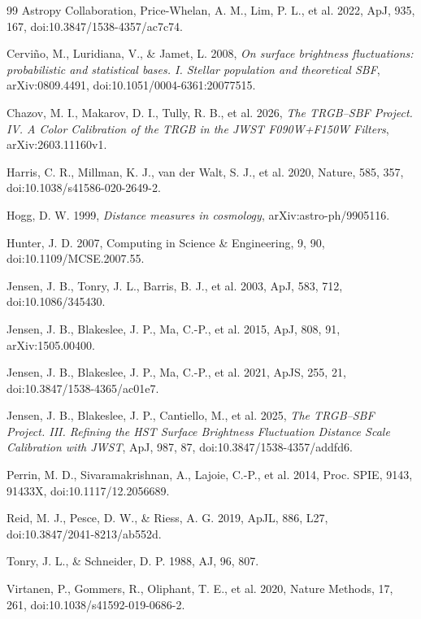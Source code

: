 \documentclass[nodoi,nocopyright]{pas}
\begin{document}
\FloatBarrier

\begin{thebibliography}{99}
Astropy Collaboration, Price-Whelan, A. M., Lim, P. L., et al. 2022,
ApJ, 935, 167, doi:10.3847/1538-4357/ac7c74.

Cervi\~no, M., Luridiana, V., \& Jamet, L. 2008,
\emph{On surface brightness fluctuations: probabilistic and statistical
bases. I. Stellar population and theoretical SBF},
arXiv:0809.4491, doi:10.1051/0004-6361:20077515.

Chazov, M. I., Makarov, D. I., Tully, R. B., et al. 2026,
\emph{The TRGB--SBF Project. IV. A Color Calibration of the TRGB in the
JWST F090W+F150W Filters}, arXiv:2603.11160v1.

Harris, C. R., Millman, K. J., van der Walt, S. J., et al. 2020,
Nature, 585, 357, doi:10.1038/s41586-020-2649-2.

Hogg, D. W. 1999, \emph{Distance measures in cosmology},
arXiv:astro-ph/9905116.

Hunter, J. D. 2007, Computing in Science \& Engineering, 9, 90,
doi:10.1109/MCSE.2007.55.

Jensen, J. B., Tonry, J. L., Barris, B. J., et al. 2003,
ApJ, 583, 712, doi:10.1086/345430.

Jensen, J. B., Blakeslee, J. P., Ma, C.-P., et al. 2015,
ApJ, 808, 91, arXiv:1505.00400.

Jensen, J. B., Blakeslee, J. P., Ma, C.-P., et al. 2021,
ApJS, 255, 21, doi:10.3847/1538-4365/ac01e7.

Jensen, J. B., Blakeslee, J. P., Cantiello, M., et al. 2025,
\emph{The TRGB--SBF Project. III. Refining the HST Surface Brightness
Fluctuation Distance Scale Calibration with JWST},
ApJ, 987, 87, doi:10.3847/1538-4357/addfd6.

Perrin, M. D., Sivaramakrishnan, A., Lajoie, C.-P., et al. 2014,
Proc. SPIE, 9143, 91433X, doi:10.1117/12.2056689.

Reid, M. J., Pesce, D. W., \& Riess, A. G. 2019,
ApJL, 886, L27, doi:10.3847/2041-8213/ab552d.

Tonry, J. L., \& Schneider, D. P. 1988, AJ, 96, 807.

Virtanen, P., Gommers, R., Oliphant, T. E., et al. 2020,
Nature Methods, 17, 261, doi:10.1038/s41592-019-0686-2.

\end{thebibliography}
\label{LastArticlePage}
\end{document}
